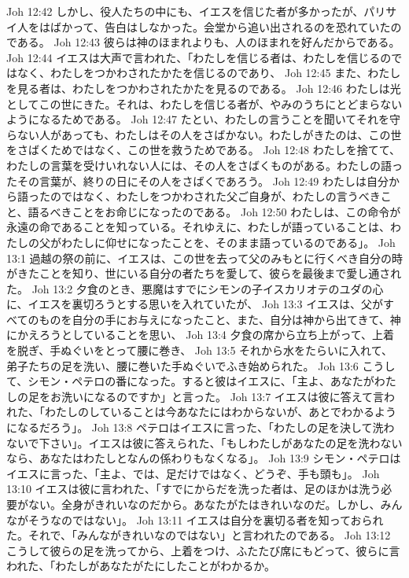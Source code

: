Joh 12:42  しかし、役人たちの中にも、イエスを信じた者が多かったが、パリサイ人をはばかって、告白はしなかった。会堂から追い出されるのを恐れていたのである。
Joh 12:43  彼らは神のほまれよりも、人のほまれを好んだからである。
Joh 12:44  イエスは大声で言われた、「わたしを信じる者は、わたしを信じるのではなく、わたしをつかわされたかたを信じるのであり、
Joh 12:45  また、わたしを見る者は、わたしをつかわされたかたを見るのである。
Joh 12:46  わたしは光としてこの世にきた。それは、わたしを信じる者が、やみのうちにとどまらないようになるためである。
Joh 12:47  たとい、わたしの言うことを聞いてそれを守らない人があっても、わたしはその人をさばかない。わたしがきたのは、この世をさばくためではなく、この世を救うためである。
Joh 12:48  わたしを捨てて、わたしの言葉を受けいれない人には、その人をさばくものがある。わたしの語ったその言葉が、終りの日にその人をさばくであろう。
Joh 12:49  わたしは自分から語ったのではなく、わたしをつかわされた父ご自身が、わたしの言うべきこと、語るべきことをお命じになったのである。
Joh 12:50  わたしは、この命令が永遠の命であることを知っている。それゆえに、わたしが語っていることは、わたしの父がわたしに仰せになったことを、そのまま語っているのである」。
Joh 13:1  過越の祭の前に、イエスは、この世を去って父のみもとに行くべき自分の時がきたことを知り、世にいる自分の者たちを愛して、彼らを最後まで愛し通された。
Joh 13:2  夕食のとき、悪魔はすでにシモンの子イスカリオテのユダの心に、イエスを裏切ろうとする思いを入れていたが、
Joh 13:3  イエスは、父がすべてのものを自分の手にお与えになったこと、また、自分は神から出てきて、神にかえろうとしていることを思い、
Joh 13:4  夕食の席から立ち上がって、上着を脱ぎ、手ぬぐいをとって腰に巻き、
Joh 13:5  それから水をたらいに入れて、弟子たちの足を洗い、腰に巻いた手ぬぐいでふき始められた。
Joh 13:6  こうして、シモン・ペテロの番になった。すると彼はイエスに、「主よ、あなたがわたしの足をお洗いになるのですか」と言った。
Joh 13:7  イエスは彼に答えて言われた、「わたしのしていることは今あなたにはわからないが、あとでわかるようになるだろう」。
Joh 13:8  ペテロはイエスに言った、「わたしの足を決して洗わないで下さい」。イエスは彼に答えられた、「もしわたしがあなたの足を洗わないなら、あなたはわたしとなんの係わりもなくなる」。
Joh 13:9  シモン・ペテロはイエスに言った、「主よ、では、足だけではなく、どうぞ、手も頭も」。
Joh 13:10  イエスは彼に言われた、「すでにからだを洗った者は、足のほかは洗う必要がない。全身がきれいなのだから。あなたがたはきれいなのだ。しかし、みんながそうなのではない」。
Joh 13:11  イエスは自分を裏切る者を知っておられた。それで、「みんながきれいなのではない」と言われたのである。
Joh 13:12  こうして彼らの足を洗ってから、上着をつけ、ふたたび席にもどって、彼らに言われた、「わたしがあなたがたにしたことがわかるか。
